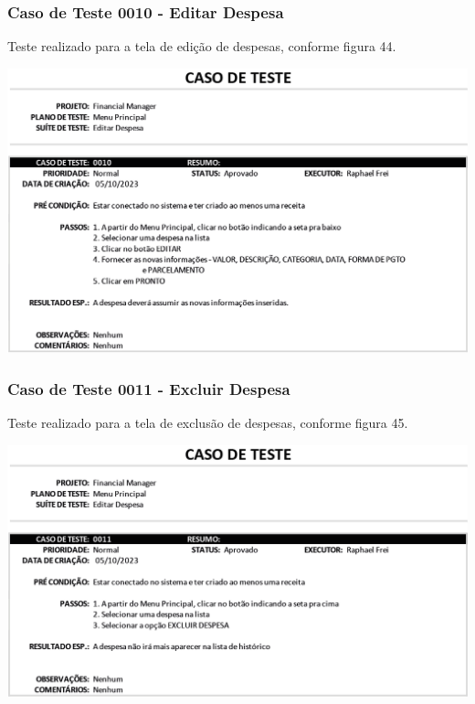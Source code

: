 \subsubsection{Caso de Teste 0010 - Editar Despesa}

Teste realizado para a tela de edição de despesas, conforme figura 44.

    \begin{center}
        \begin{minipage}{\textwidth}
            \centering
            \includegraphics[scale=0.8]{figs/caso-testes-0010.png}
            \label{fig:figura44}
        \end{minipage}
    \end{center} 

\subsubsection{Caso de Teste 0011 - Excluir Despesa}

Teste realizado para a tela de exclusão de despesas, conforme figura 45.

    \begin{center}
        \begin{minipage}{\textwidth}
            \centering
            \includegraphics[scale=0.8]{figs/caso-testes-0011.png}
            \label{fig:figura45}
        \end{minipage}
    \end{center} 
